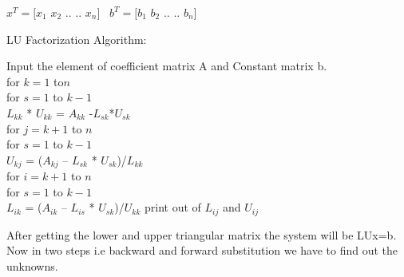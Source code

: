\documentclass[a4paper, 10pt]{article}
\begin{document}
	\begin{center}
	$x^T=[x_1$   $x_2$   $..$   $..$   $x_n]$         
	\ $b^T=[b_1$   $b_2$   $..$   $..$   $b_n]$ 
\end{center}

LU Factorization Algorithm:

\begin{algorithm}[H]
\do Input the element of coefficient matrix A and Constant matrix b.\\
\do for $k = 1$ to$ n$\\
			for $s = 1$ to $k-1$\\
			$L_{kk}$ * $U_{kk}$  = $A_{kk}$  -$ L_{sk}$*$ U_{sk}$\\
\do for $j = k+1$ to $n$\\ 
\do for $s=1$ to $k-1$\\
$U_{kj}$ = ($A_{kj}$ – $L_{sk}$ * $U_{sk}$)/$L_{kk}$\\
\do for $i = k+1$ to $n$\\
\do for $s =1$ to $k-1$\\
			$L_{ik}$ = ($A_{ik}$ – $L_{is}$ * $U_{sk}$)/$U_{kk}$
\do print out of $L_{ij}$ and $U_{ij}$

\end{algorithm}
After getting the lower and upper triangular matrix the system will be LUx=b. Now in two steps i.e backward and forward substitution we have to find out the unknowns.
\end{document}

